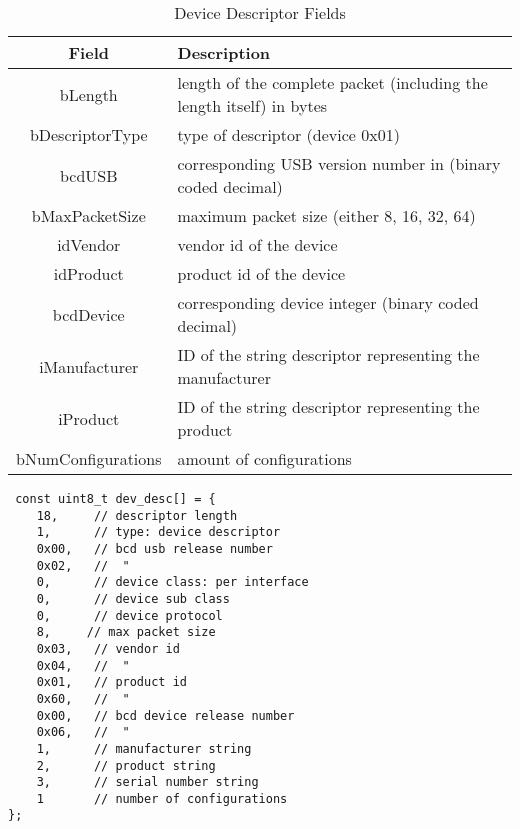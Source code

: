 \begin{table}[h!]
\begin{tabular}{c| p{10cm}}
Field & Description \\ \hline
bLength & length of the complete packet (including the length itself) in bytes \\
bDescriptorType & type of descriptor (device 0x01) \\
bcdUSB & corresponding USB version number in (binary coded decimal) \\ 
bMaxPacketSize & maximum packet size (either 8, 16, 32, 64)\\
idVendor & vendor id of the device\\
idProduct & product id of the device\\ 
bcdDevice & corresponding device integer (binary coded decimal) \\
iManufacturer & ID of the string descriptor representing the manufacturer\\
iProduct & ID of the string descriptor representing the product \\
bNumConfigurations & amount of configurations \\ 
\end{tabular}
\caption{Device Descriptor Fields}
\end{table}

\begin{verbatim}
 const uint8_t dev_desc[] = {
	18,     // descriptor length
	1,      // type: device descriptor
	0x00,   // bcd usb release number
	0x02,   //  "
	0,      // device class: per interface
	0,      // device sub class
	0,      // device protocol
	8,     // max packet size
	0x03,   // vendor id
	0x04,   //  "
	0x01,   // product id
	0x60,   //  "
	0x00,   // bcd device release number
	0x06,   //  "
	1,      // manufacturer string
	2,      // product string
	3,      // serial number string
	1       // number of configurations
};
\end{verbatim}


